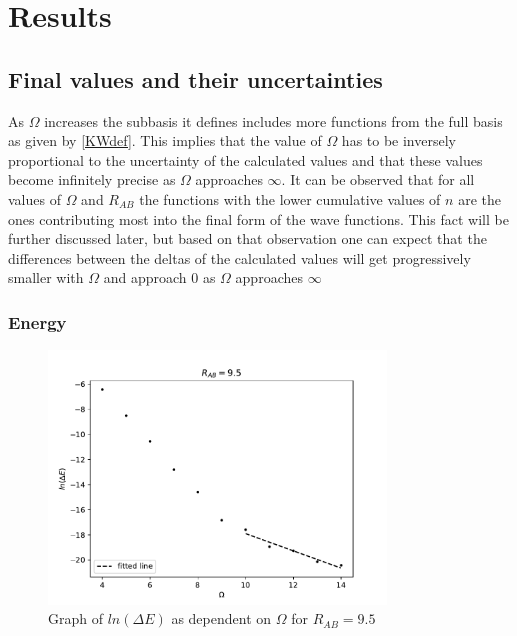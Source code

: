 \documentclass{pracalicmgr}
\begin{document}
\chapter{Results}

\section{Final values and their uncertainties}

As $\Omega$ increases the subbasis it defines includes more functions from the full basis as given by \ref{KWdef}. This implies that the value of $\Omega$ has to be inversely proportional to the uncertainty of the calculated values and that these values become infinitely precise as $\Omega$ approaches $\infty$. It can be observed that for all values of $\Omega$ and $R_{AB}$ the functions with the lower cumulative values of $n$ are the ones contributing most into the final form of the wave functions. This fact will be further discussed later, but based on that observation one can expect that the differences between the deltas of the calculated values will get progressively smaller with $\Omega$ and approach 0 as $\Omega$ approaches $\infty$

\subsection{Energy}

\begin{figure}[H]
    \center
    \includegraphics[width=0.8\textwidth]{E9.5.pdf}
    \caption{Graph of $ln\left(\Delta E\right)$ as dependent on $\Omega$ for  $R_{AB} = 9.5$}
    \label{delE fitted}
\end{figure}
\end{document}
